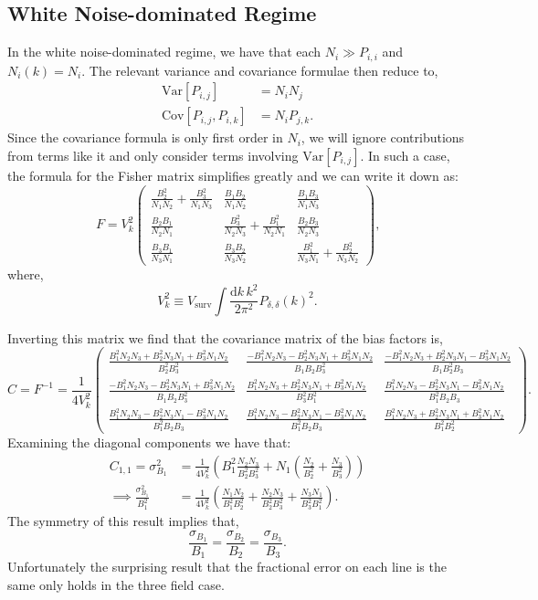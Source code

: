 \documentclass{aastex62}
\newcommand{\beq}{\begin{equation}}
\newcommand{\eeq}{\end{equation}}
\newcommand{\ps}[1]{\ensuremath{P_{#1,#1}}}
\newcommand{\xps}[2]{\ensuremath{P_{#1,#2}}}
\newcommand{\denps}{\ensuremath{P_{\delta,\delta}}}
\newcommand{\Var}[1]{\mathrm{Var}[#1]}
\newcommand{\Cov}[2]{\mathrm{Cov}[#1,#2]}
\begin{document}
\subsection{White Noise-dominated Regime} \label{ssec:tf_noisedom}
In the white noise-dominated regime, we have that each $N_i \gg \ps{i}$ and
$N_i(k) = N_i$. The relevant variance and covariance formulae then reduce to,
\beq\label{eq:var_cov}
\begin{split}
\Var{\xps{i}{j}} &= N_iN_j \\
\Cov{\xps{i}{j}}{\xps{i}{k}} &= N_i\xps{j}{k}\text{.}
\end{split}
\eeq
Since the covariance formula is only first order in $N_i$, we will ignore
contributions from terms like it and only consider terms involving
$\Var{\xps{i}{j}}$. In such a case, the formula for the Fisher matrix
simplifies greatly and we can write it down as:
\beq \label{eq:fmat_tf_exp}
F = V_k^2
\begin{pmatrix}
\frac{B_2^2}{N_1N_2}+\frac{B_3^2}{N_1N_3} & \frac{B_1B_2}{N_1N_2} & \frac{B_1B_3}{N_1N_3} \\
\frac{B_2B_1}{N_2N_1} & \frac{B_3^2}{N_2N_3}+\frac{B_1^2}{N_2N_1} & \frac{B_2B_3}{N_2N_3} \\
\frac{B_3B_1}{N_3N_1} & \frac{B_3B_2}{N_3N_2} & \frac{B_1^2}{N_3N_1}+\frac{B_2^2}{N_3N_2}
\end{pmatrix}
\text{,}
\eeq
where,
\beq \label{eq:Vk}
V_k^2 \equiv V_{\text{surv}} \int \frac{\text{d}k\,k^2}{2\pi^2} \denps(k)^2\text{.}
\eeq

Inverting this matrix we find that the covariance matrix of the bias factors is,
\beq \label{eq:covmat_tf_wn}
C = F^{-1} = \frac{1}{4V_k^2}
\begin{pmatrix}
\frac{B_1^2N_2N_3 + B_2^2N_3N_1 + B_3^2N_1N_2}{B_2^2B_3^2} & \frac{-B_1^2N_2N_3 - B_2^2N_3N_1 + B_3^2N_1N_2}{B_1B_2B_3^2} & \frac{-B_1^2N_2N_3 + B_2^2N_3N_1 - B_3^2N_1N_2}{B_1B_2^2B_3} \\
\frac{-B_1^2N_2N_3 - B_2^2N_3N_1 + B_3^2N_1N_2}{B_1B_2B_3^2} & \frac{B_1^2N_2N_3 + B_2^2N_3N_1 + B_3^2N_1N_2}{B_3^2B_1^2} & \frac{B_1^2N_2N_3 - B_2^2N_3N_1 - B_3^2N_1N_2}{B_1^2B_2B_3} \\
\frac{B_1^2N_2N_3 - B_2^2N_3N_1 - B_3^2N_1N_2}{B_1^2B_2B_3} & \frac{B_1^2N_2N_3 - B_2^2N_3N_1 - B_3^2N_1N_2}{B_1^2B_2B_3} & \frac{B_1^2N_2N_3 + B_2^2N_3N_1 + B_3^2N_1N_2}{B_1^2B_2^2}
\end{pmatrix}
\text{.}
\eeq
Examining the diagonal components we have that:
\beq \label{eq:var_bias_tf_wn}
\begin{split}
C_{1,1} = \sigma_{B_1}^2 &= \frac{1}{4V_k^2} \left( B_1^2 \frac{N_2N_3}{B_2^2B_3^2} + N_1(\frac{N_2}{B_2^2} + \frac{N_3}{B_3^2}) \right) \\
\implies \frac{\sigma_{B_1}^2}{B_1^2} &= \frac{1}{4V_k^2} \left( \frac{N_1N_2}{B_1^2B_2^2} + \frac{N_2N_3}{B_2^2B_3^2} + \frac{N_3N_1}{B_3^2B_1^2} \right)\text{.}
\end{split}
\eeq
The symmetry of this result implies that,
\beq \label{eq:frac_error_same}
\frac{\sigma_{B_1}}{B_1} = \frac{\sigma_{B_2}}{B_2} = 
\frac{\sigma_{B_3}}{B_3}\text{.}
\eeq
Unfortunately the surprising result that the fractional error on each line is
the same only holds in the three field case.
\end{document}
